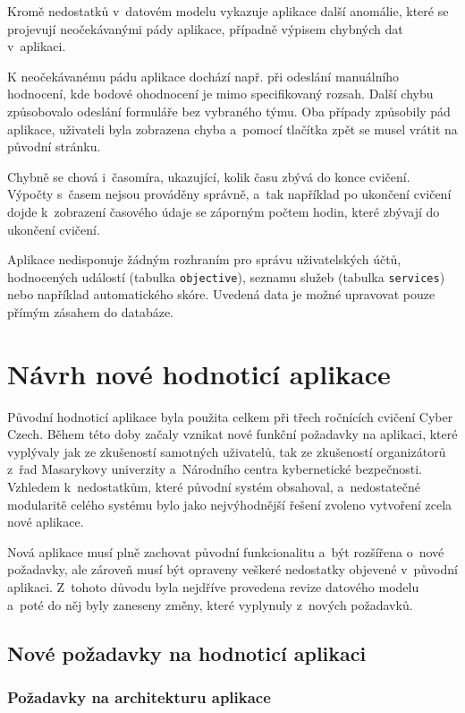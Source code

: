 \documentclass[
  digital,
  twoside,
  table, 
  nolof, 
  nolot
]{fithesis3}
\begin{document}
Kromě nedostatků v~datovém modelu vykazuje aplikace další anomálie, které se projevují neočekávanými pády aplikace, případně výpisem chybných dat v~aplikaci.

K neočekávanému pádu aplikace dochází např. při odeslání manuálního hodnocení, kde bodové ohodnocení je mimo specifikovaný rozsah. Další chybu způsobovalo odeslání formuláře bez vybraného týmu. Oba případy způsobily pád aplikace, uživateli byla zobrazena chyba a~pomocí tlačítka zpět se musel vrátit na původní stránku.

Chybně se chová i~časomíra, ukazující, kolik času zbývá do konce cvičení. Výpočty s~časem nejsou prováděny správně, a~tak například po ukončení cvičení dojde k~zobrazení časového údaje se záporným počtem hodin, které zbývají do ukončení cvičení.

Aplikace nedisponuje žádným rozhraním pro správu uživatelských účtů, hodnocených událostí (tabulka \texttt{objective}), seznamu služeb (tabulka \texttt{services}) nebo například automatického skóre. Uvedená data je možné upravovat pouze přímým zásahem do databáze.

\chapter{Návrh nové hodnoticí aplikace}
\label{newApp}
Původní hodnoticí aplikace byla použita celkem při třech ročnících cvičení Cyber Czech. Během této doby začaly vznikat nové funkční požadavky na aplikaci, které vyplývaly jak ze zkušeností samotných uživatelů, tak ze zkušeností organizátorů z~řad Masarykovy univerzity a~Národního centra kybernetické bezpečnosti. Vzhledem k~nedostatkům, které původní systém obsahoval, a~nedostatečné modularitě celého systému bylo jako nejvýhodnější řešení zvoleno vytvoření zcela nové aplikace. 

Nová aplikace musí plně zachovat původní funkcionalitu a~být rozšířena o~nové požadavky, ale zároveň musí být opraveny veškeré nedostatky objevené v~původní aplikaci. Z~tohoto důvodu byla nejdříve provedena revize datového modelu a~poté do něj byly zaneseny změny, které vyplynuly z~nových požadavků. 

\section{Nové požadavky na hodnoticí aplikaci}
\subsection{Požadavky na architekturu aplikace}
\end{document}
